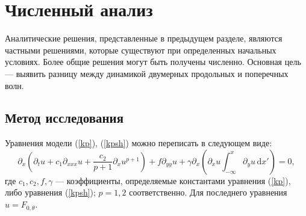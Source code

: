 \section{Численный анализ}
Аналитические решения, представленные в предыдущем разделе, являются частными решениями, которые существуют при определенных начальных условиях. Более общие решения могут быть получены численно. Основная цель --- выявить разницу между динамикой двумерных продольных и поперечных волн.

\subsection{Метод исследования}
Уравнения модели (\ref {kp}), (\ref {kpsh}) можно переписать в следующем виде:
\begin{equation}
	\label{kp3gen}
	\partial_x\left(\partial_t u+c_1 \partial_{xxx} u+\frac{c_2 }{p+1}\partial_x u^{p+1}\right)+f \partial_{yy} u+\gamma \partial_x\left(\partial_x u \int_{-\infty}^x \partial_y u \, \mathrm{d} x'\right)=0,
\end{equation}
где $ c_1, c_2, f, \gamma $ --- коэффициенты, определяемые константами уравнения (\ref{kp}), либо уравнения (\ref{kpsh}); $ p = 1,2 $ соответственно. Для последнего уравнения $u = F_{0, \theta} $.

